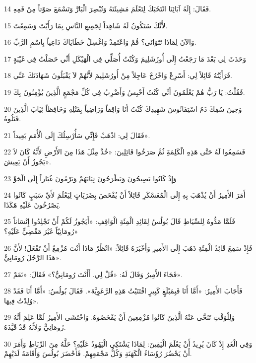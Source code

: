 \par 14 فَقَالَ: إِلَهُ آبَائِنَا انْتَخَبَكَ لِتَعْلَمَ مَشِيئَتَهُ وَتُبْصِرَ الْبَارَّ وَتَسْمَعَ صَوْتاً مِنْ فَمِهِ.
\par 15 لأَنَّكَ سَتَكُونُ لَهُ شَاهِداً لِجَمِيعِ النَّاسِ بِمَا رَأَيْتَ وَسَمِعْتَ.
\par 16 وَالآنَ لِمَاذَا تَتَوَانَى؟ قُمْ وَاعْتَمِدْ وَاغْسِلْ خَطَايَاكَ دَاعِياً بِاسْمِ الرَّبِّ.
\par 17 وَحَدَثَ لِي بَعْدَ مَا رَجَعْتُ إِلَى أُورُشَلِيمَ وَكُنْتُ أُصَلِّي فِي الْهَيْكَلِ أَنِّي حَصَلْتُ فِي غَيْبَةٍ
\par 18 فَرَأَيْتُهُ قَائِلاً لِي: أَسْرِعْ وَاخْرُجْ عَاجِلاً مِنْ أُورُشَلِيمَ لأَنَّهُمْ لاَ يَقْبَلُونَ شَهَادَتَكَ عَنِّي.
\par 19 فَقُلْتُ: يَا رَبُّ هُمْ يَعْلَمُونَ أَنِّي كُنْتُ أَحْبِسُ وَأَضْرِبُ فِي كُلِّ مَجْمَعٍ الَّذِينَ يُؤْمِنُونَ بِكَ.
\par 20 وَحِينَ سُفِكَ دَمُ اسْتِفَانُوسَ شَهِيدِكَ كُنْتُ أَنَا وَاقِفاً وَرَاضِياً بِقَتْلِهِ وَحَافِظاً ثِيَابَ الَّذِينَ قَتَلُوهُ.
\par 21 فَقَالَ لِي: اذْهَبْ فَإِنِّي سَأُرْسِلُكَ إِلَى الْأُمَمِ بَعِيداً».
\par 22 فَسَمِعُوا لَهُ حَتَّى هَذِهِ الْكَلِمَةَِ ثُمَّ صَرَخُوا قَائِلِينَ: «خُذْ مِثْلَ هَذَا مِنَ الأَرْضِ لأَنَّهُ كَانَ لاَ يَجُوزُ أَنْ يَعِيشَ».
\par 23 وَإِذْ كَانُوا يَصِيحُونَ وَيَطْرَحُونَ ثِيَابَهُمْ وَيَرْمُونَ غُبَاراً إِلَى الْجَوِّ
\par 24 أَمَرَ الأَمِيرُ أَنْ يُذْهَبَ بِهِ إِلَى الْمُعَسْكَرِ قَائِلاً أَنْ يُفْحَصَ بِضَرَبَاتٍ لِيَعْلَمَ لأَيِّ سَبَبٍ كَانُوا يَصْرُخُونَ عَلَيْهِ هَكَذَا.
\par 25 فَلَمَّا مَدُّوهُ لِلسِّيَاطِ قَالَ بُولُسُ لِقَائِدِ الْمِئَةِ الْوَاقِفِ: «أَيَجُوزُ لَكُمْ أَنْ تَجْلِدُوا إِنْسَاناً رُومَانِيّاً غَيْرَ مَقْضِيٍّ عَلَيْهِ؟»
\par 26 فَإِذْ سَمِعَ قَائِدُ الْمِئَةِ ذَهَبَ إِلَى الأَمِيرِ وَأَخْبَرَهُ قَائِلاً: «انْظُرْ مَاذَا أَنْتَ مُزْمِعٌ أَنْ تَفْعَلَ! لأَنَّ هَذَا الرَّجُلَ رُومَانِيٌّ».
\par 27 فَجَاءَ الأَمِيرُ وَقَالَ لَهُ: «قُلْ لِي. أَأَنْتَ رُومَانِيٌّ؟» فَقَالَ: «نَعَمْ».
\par 28 فَأَجَابَ الأَمِيرُ: «أَمَّا أَنَا فَبِمَبْلَغٍ كَبِيرٍ اقْتَنَيْتُ هَذِهِ الرَّعَوِيَّةَ». فَقَالَ بُولُسُ: «أَمَّا أَنَا فَقَدْ وُلِدْتُ فِيهَا».
\par 29 وَلِلْوَقْتِ تَنَحَّى عَنْهُ الَّذِينَ كَانُوا مُزْمِعِينَ أَنْ يَفْحَصُوهُ. وَاخْتَشَى الأَمِيرُ لَمَّا عَلِمَ أَنَّهُ رُومَانِيٌّ وَلأَنَّهُ قَدْ قَيَّدَهُ.
\par 30 وَفِي الْغَدِ إِذْ كَانَ يُرِيدُ أَنْ يَعْلَمَ الْيَقِينَ: لِمَاذَا يَشْتَكِي الْيَهُودُ عَلَيْهِ؟ حَلَّهُ مِنَ الرِّبَاطِ وَأَمَرَ أَنْ يَحْضُرَ رُؤَسَاءُ الْكَهَنَةِ وَكُلُّ مَجْمَعِهِمْ. فَأَحْضَرَ بُولُسَ وَأَقَامَهُ لَدَيْهِمْ.

